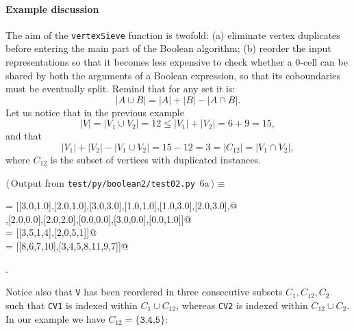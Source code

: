 \documentclass[11pt,oneside]{article}	%
\begin{document}
\paragraph{Example discussion} 
The aim of the \texttt{vertexSieve} function is twofold: (a) eliminate vertex duplicates before entering the main part of the Boolean algorithm; (b) reorder the input representations so that it becomes less expensive to check whether a 0-cell can be shared by both the arguments of a Boolean expression, so that its coboundaries must be eventually split. Remind that for any set it is:
\[
|A\cup B| = |A|+|B|-|A\cap B|.
\]
Let us notice that in the previous example
\[
|V| = |V_1 \cup V_2| = 12 \leq |V_1|+|V_2| = 6+9 = 15,
\]
and that 
\[
|V_1|+|V_2| - |V_1 \cup V_2| = 15 - 12 = 3 = |C_{12}| = |V_1 \cap V_2|,
\]
where $C_{12}$ is the subset of vertices with duplicated instances.
\begin{flushleft} \small \label{scrap10}
\protect{}$\langle\,$Output from \texttt{test/py/boolean2/test02.py}\nobreak\ {\footnotesize 6a}$\,\rangle\equiv$
\vspace{-1ex}
\begin{list}{}{} \item
\mbox{}\verb@V   = [[3.0,1.0],[2.0,1.0],[3.0,3.0],[1.0,1.0],[1.0,3.0],[2.0,3.0],@\\
\mbox{}\verb@       [3.0,2.0],[2.0,0.0],[2.0,2.0],[0.0,0.0],[3.0,0.0],[0.0,1.0]]@\\
\mbox{} = [[3,5,1,4],[2,0,5,1]]@\\
\mbox{} = [[8,6,7,10],[3,4,5,8,11,9,7]]@\\
\mbox{}\verb@@{\NWsep}
\end{list}
\vspace{-1ex}
\footnotesize\addtolength{\baselineskip}{-1ex}
\begin{list}{}{\setlength{\itemsep}{-\parsep}\setlength{\itemindent}{-\leftmargin}}
\item {\NWtxtMacroNoRef}.
\end{list}
\end{flushleft}
Notice also that \texttt{V} has been reordered in three consecutive subsets $C_{1},C_{12},C_{2}$ such that \texttt{CV1} is indexed within $C_{1}\cup C_{12}$, whereas \texttt{CV2} is indexed within $C_{12}\cup C_{2}$. In our example we have  $C_{12}=\{\texttt{3,4,5}\}$: 
\end{document}
